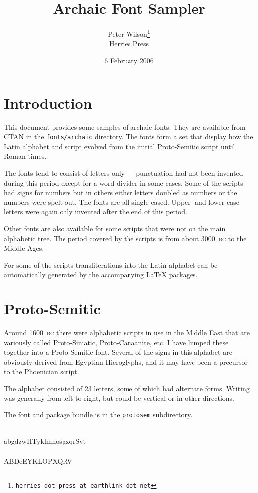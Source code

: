 \documentclass{article}
\title{Archaic Font Sampler}
\author{Peter Wilson\thanks{\texttt{herries dot press at earthlink dot net}}\\
        Herries Press}
\date{6 February 2006}
\newcommand{\BC}{\textsc{bc}}
\begin{document}
\maketitle
\tableofcontents

\clearpage
\section{Introduction}

    This document provides some samples of archaic fonts. They are
available from CTAN in the \texttt{fonts/archaic} directory. The fonts
form a set that display how the Latin alphabet and script evolved from the
initial Proto-Semitic script until Roman times.

    The fonts tend to consist of letters only --- punctuation had not 
been invented during this period except for a word-divider in some cases.
Some of the scripts had signs for numbers but in others either letters
doubled as numbers or the numbers were spelt out. The fonts are all
single-cased. Upper- and lower-case letters were again only invented after
the end of this period.

    Other fonts are also available for some scripts that were not on the
main alphabetic tree. The period covered by the scripts is from about 
3000~\BC{} to the Middle Ages.

    For some of the scripts transliterations into the Latin alphabet can
be automatically generated by the accompanying LaTeX packages.

\clearpage


\section{Proto-Semitic}

    Around 1600~\BC{} there were alphabetic scripts in use in the Middle East
that are variously called Proto-Siniatic, Proto-Canaanite, etc. I
have lumped these together into a Proto-Semitic font. Several
of the signs in this alphabet are obviously derived from Egyptian
Hieroglyphs, and it may have been a precursor to the Phoenician script.

    The alphabet consisted of 23 letters, some of which had alternate
forms. Writing was generally from left to right, but could be vertical
or in other directions.

    The font and package bundle is in the \texttt{protosem} subdirectory.

\begin{center}
\protofamily
\Aaleph \Abeth \Agimel \Adaleth \Azayin \Ahe \Avav \Aheth \Ateth
\Ayod \Akaph \Alamed \Amem \Anun \Aayin \Asamekh \Ape \Asade \Aqoph 
\Aresh \Ashin \Ahelmet \Atav \\
abgdzwHTyklmnospxqrSvt \\
\AAaleph \AAbeth \AAdaleth \AAhe \AAheth 
\AAyod \AAkaph \AAlamed \AAayin \AApe \AAsade \AAqoph 
\AAresh \AAhelmet \\
ABDeEYKLOPXQRV
\end{center}
\end{document}
